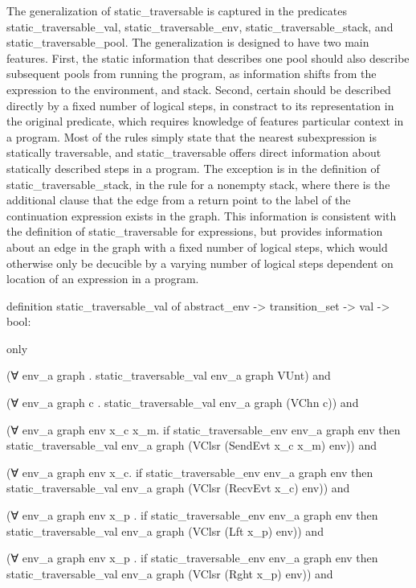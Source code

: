 The generalization of static_traversable is captured in the predicates static_traversable_val,
static_traversable_env, static_traversable_stack, and static_traversable_pool.  The
generalization is designed to have two main features.  First, the static information that
describes one pool should also describe subsequent pools from running the program, as
information shifts from the expression to the environment, and stack.  Second, certain should
be described directly by a fixed number of logical steps, in constract to its representation in
the original predicate, which requires knowledge of features particular context in a program.
Most of the rules simply state that the nearest subexpression is statically traversable, and
static_traversable offers direct information about statically described steps in a program.
The exception is in the definition of static_traversable_stack, in the rule for a nonempty
stack, where there is the additional clause that the edge from a return point to the label of
the continuation expression exists in the graph.  This information is consistent with the
definition of static_traversable for expressions, but provides information about an edge in the
graph with a fixed number of logical steps, which would otherwise only be decucible by a
varying number of logical steps dependent on location of an expression in a program.



definition static_traversable_val of abstract_env -> transition_set -> val -> bool:

only

(∀ env_a graph . static_traversable_val env_a graph VUnt) and 

(∀ env_a graph c . static_traversable_val env_a graph (VChn c)) and

(∀ env_a graph env x_c x_m.
  if
    static_traversable_env env_a graph env 
  then 
    static_traversable_val env_a graph (VClsr (SendEvt x_c x_m) env)) and

(∀ env_a graph env x_c.
  if
    static_traversable_env env_a graph env 
  then
    static_traversable_val env_a graph (VClsr (RecvEvt x_c) env)) and

(∀ env_a graph env x_p .
  if
    static_traversable_env env_a graph env 
  then
    static_traversable_val env_a graph (VClsr (Lft x_p) env)) and

(∀ env_a graph env x_p .
  if
    static_traversable_env env_a graph env
  then
    static_traversable_val env_a graph (VClsr (Rght x_p) env)) and

